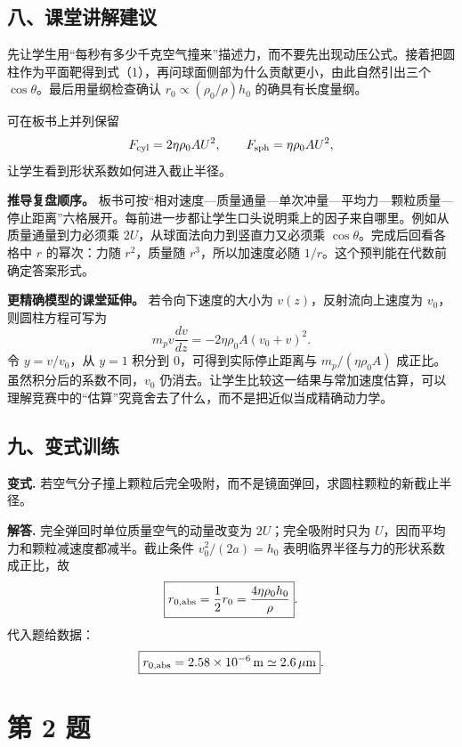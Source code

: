 \documentclass[12pt,a4paper,UTF8]{ctexart}
\begin{document}
\subsection{八、课堂讲解建议}\label{ux516bux8bfeux5802ux8bb2ux89e3ux5efaux8bae}

先让学生用``每秒有多少千克空气撞来''描述力，而不要先出现动压公式。接着把圆柱作为平面靶得到式（1），再问球面侧部为什么贡献更小，由此自然引出三个
\(\cos\theta\)。最后用量纲检查确认 \(r_0\propto(\rho_0/\rho)h_0\)
的确具有长度量纲。

可在板书上并列保留 \[
F_{\rm cyl}=2\eta\rho_0AU^2,\qquad
F_{\rm sph}=\eta\rho_0AU^2,
\] 让学生看到形状系数如何进入截止半径。

\textbf{推导复盘顺序。}
板书可按``相对速度---质量通量---单次冲量---平均力---颗粒质量---停止距离''六格展开。每前进一步都让学生口头说明乘上的因子来自哪里。例如从质量通量到力必须乘
\(2U\)，从球面法向力到竖直力又必须乘 \(\cos\theta\)。完成后回看各格中
\(r\) 的幂次：力随 \(r^2\)，质量随 \(r^3\)，所以加速度必随
\(1/r\)。这个预判能在代数前确定答案形式。

\textbf{更精确模型的课堂延伸。} 若令向下速度的大小为
\(v(z)\)，反射流向上速度为 \(v_0\)，则圆柱方程可写为 \[
m_pv\frac{dv}{dz}
=-2\eta\rho_0A(v_0+v)^2.
\] 令 \(y=v/v_0\)，从 \(y=1\) 积分到 \(0\)，可得到实际停止距离与
\(m_p/(\eta\rho_0A)\) 成正比。虽然积分后的系数不同，\(v_0\)
仍消去。让学生比较这一结果与常加速度估算，可以理解竞赛中的``估算''究竟舍去了什么，而不是把近似当成精确动力学。

\subsection{九、变式训练}\label{ux4e5dux53d8ux5f0fux8badux7ec3}

\textbf{变式.}
若空气分子撞上颗粒后完全吸附，而不是镜面弹回，求圆柱颗粒的新截止半径。

\textbf{解答.} 完全弹回时单位质量空气的动量改变为 \(2U\)；完全吸附时只为
\(U\)，因而平均力和颗粒减速度都减半。截止条件 \(v_0^2/(2a)=h_0\)
表明临界半径与力的形状系数成正比，故 \[
\boxed{r_{0,\rm abs}=\frac12r_0
=\frac{4\eta\rho_0h_0}{\rho}}.
\] 代入题给数据： \[
\boxed{r_{0,\rm abs}=2.58\times10^{-6}\,\mathrm m
\simeq2.6\,\mu\mathrm m}.
\]

\newpage

\section{第 2 题}\label{ux7b2c-2-ux9898}
\end{document}
